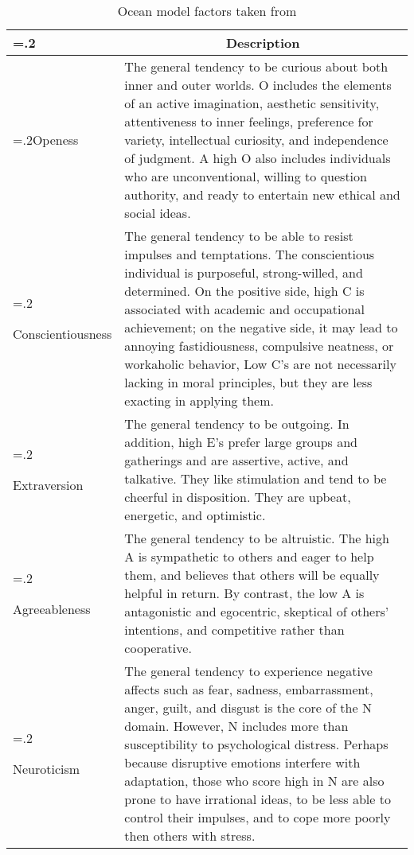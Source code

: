 \begin{table}[]
\begin{tabularx}{1.2\textwidth}{|>{\hsize=.2\hsize}X|X|}
    \hline
    \multicolumn{1}{|c|}{\textbf{Personality Trait}} & \multicolumn{1}{c|}{\textbf{Description}} \\
    \hline
    
    Openess & The general tendency to be curious about both inner and outer worlds.
    O includes the elements of an active imagination, aesthetic sensitivity,
    attentiveness to inner feelings, preference for variety, intellectual
    curiosity, and independence of judgment. A high O also includes individuals
    who are unconventional, willing to question authority, and ready to entertain
    new ethical and social ideas. \\
    \hline
    
    Conscientiousness & The general tendency to be able to resist impulses and
    temptations. The conscientious individual is purposeful, strong-willed, and
    determined.
    On the positive side, high C is associated with academic and occupational
    achievement; on the negative side, it may lead to annoying
    fastidiousness, compulsive neatness, or workaholic behavior, Low C’s are not
    necessarily lacking in moral principles, but they are less exacting
    in applying them. \\
    \hline
    
    Extraversion & The general tendency to be outgoing. In addition, high E’s
    prefer large groups and gatherings and are assertive, active, and talkative.
    They like stimulation and tend to be cheerful in disposition. They are upbeat,
    energetic, and optimistic. \\ 
    \hline
    
    Agreeableness & The general tendency to be altruistic. The high A is
    sympathetic to others and eager to help them, and believes that others will
    be equally
    helpful in return. By contrast, the low A is antagonistic and egocentric,
    skeptical of others’ intentions, and competitive rather than cooperative. \\
    \hline
    
    Neuroticism & The general tendency to experience negative affects such as fear,
    sadness, embarrassment, anger, guilt, and disgust is the core of the N domain. 
    However, N includes more than susceptibility to psychological distress. Perhaps
    because disruptive emotions interfere with adaptation, those
    who score high in N are also prone to have irrational ideas, to be less able
    to control their impulses, and to cope more poorly then others with stress. \\
    \hline
  \end{tabularx}
  \label{OCEAN-Model-table}
  \caption{Ocean model factors taken from \cite{Ehrler1999}}
\end{table}


